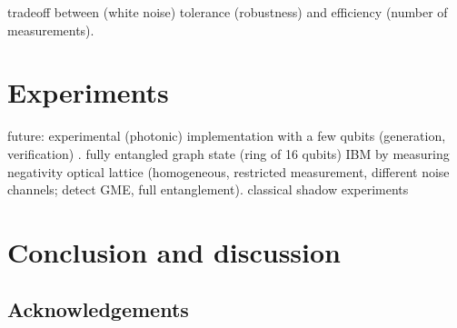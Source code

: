 \documentclass[
aps,
pra,
floatfix,
]{revtex4-2}
\theoremstyle{plain}
\theoremstyle{definition}
\begin{document}
tradeoff between (white noise) tolerance (robustness) and efficiency (number of measurements).



\section{Experiments}\label{sec:experiments}
future: experimental (photonic) implementation with a few qubits (generation, verification) \cite{luEntanglementStructureEntanglement2018}.
fully entangled graph state (ring of 16 qubits) IBM by measuring negativity \cite{wang16qubitIBMUniversal2018}
optical lattice \cite{zhouSchemeCreateVerify2022} (homogeneous, restricted measurement, different noise channels; detect GME, full entanglement).
classical shadow experiments \cite{zhangExperimentalQuantumState2021}
\cite{elbenMixedstateEntanglementLocal2020}

\section{Conclusion and discussion}

\subsection*{Acknowledgements}



%


\onecolumngrid
\appendix



\end{document}
